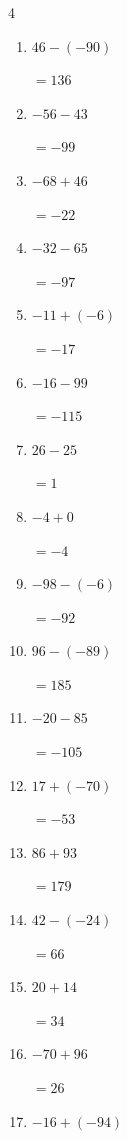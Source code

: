 \begin{multicols}{4}
\begin{enumerate}
        $=-2$

  \item $46-(-90)$

        $=136$

  \item $-56-43$

        $=-99$

\columnbreak %

  \item $-68+46$

        $=-22$

  \item $-32-65$

        $=-97$

  \item $-11+(-6)$

        $=-17$

  \item $-16-99$

        $=-115$

  \item $26-25$

        $=1$

  \item $-4+0$

        $=-4$

  \item $-98-(-6)$

        $=-92$

  \item $96-(-89)$

        $=185$

  \item $-20-85$

        $=-105$

  \item $17+(-70)$

        $=-53$

  \item $86+93$

        $=179$

  \item $42-(-24)$

        $=66$

  \item $20+14$

        $=34$

  \item $-70+96$

        $=26$

  \item $-16+(-94)$


\end{enumerate}
\end{multicols}
